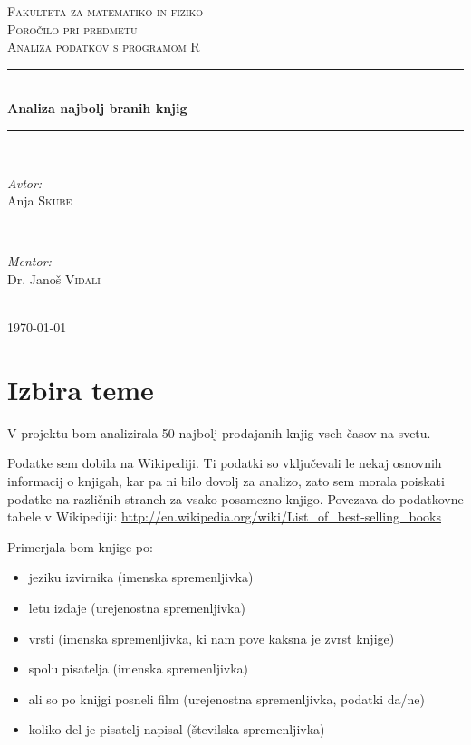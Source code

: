 \documentclass[11pt,a4paper]{article}
\begin{document}
\begin{titlepage}
\newcommand{\HRule}{\rule{\linewidth}{0.5mm}}
\center
\textsc{\LARGE Fakulteta za matematiko in fiziko}\\[3 cm]
\textsc{\Large Poročilo pri predmetu}\\[0.5cm]
\textsc{\large Analiza podatkov s programom R}\\[2 cm]
\HRule \\[0.4cm]
{ \huge \bfseries Analiza najbolj branih knjig}\\[0.4cm]
\HRule \\[6 cm]
\begin{minipage}{0.4\textwidth}
\begin{flushleft} \large
\emph{Avtor:}\\
Anja \textsc{Skube}
\end{flushleft}
\end{minipage}
~
\begin{minipage}{0.4\textwidth}
\begin{flushright} \large
\emph{Mentor:} \\
Dr. Janoš \textsc{Vidali}
\end{flushright}
\end{minipage}\\[2 cm]
{\large \today}\\[3cm]
\end{titlepage}


\section{Izbira teme}

V projektu bom analizirala 50 najbolj prodajanih knjig vseh časov na svetu. 

Podatke sem dobila na Wikipediji. Ti podatki so vključevali le nekaj osnovnih informacij o knjigah, kar pa ni bilo dovolj za analizo, zato sem morala poiskati podatke na različnih straneh za vsako posamezno knjigo. 
Povezava do podatkovne tabele v Wikipediji:
\url{http://en.wikipedia.org/wiki/List_of_best-selling_books}

Primerjala bom knjige po:

\begin{itemize}
\item jeziku izvirnika (imenska spremenljivka)
\item letu izdaje (urejenostna spremenljivka)
\item vrsti (imenska spremenljivka, ki nam pove kaksna je zvrst knjige)
\item spolu pisatelja (imenska spremenljivka)
\item ali so po knijgi posneli film (urejenostna spremenljivka, podatki da/ne)
\item koliko del je pisatelj napisal (številska spremenljivka)
\end{itemize}
\end{document}
